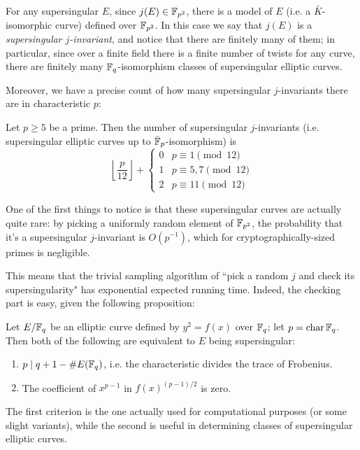 For any supersingular $E$, since $j(E)\in\mathbb{F}_{p^2}$, there is a model of $E$ (i.e. a $\bar K$-isomorphic curve) defined over $\mathbb{F}_{p^2}$. In this case we say that $j(E)$ is a \emph{supersingular $j$-invariant}, and notice that there are finitely many of them; in particular, since over a finite field there is a finite number of twists for any curve, there are finitely many $\mathbb{F}_q$-isomorphism classes of supersingular elliptic curves.

Moreover, we have a precise count of how many supersingular $j$-invariants there are in characteristic $p$:
\begin{theorem}
    Let $p\ge5$ be a prime. Then the number of supersingular $j$-invariants (i.e. supersingular elliptic curves up to $\bar{\mathbb{F}}_p$-isomorphism) is
    $$\left\lfloor \frac{p}{12} \right\rfloor + \begin{cases}
    0 & p\equiv1\pmod{12}\\
    1 & p\equiv5,7\pmod{12}\\
    2 & p\equiv11\pmod{12}
    \end{cases}$$
\end{theorem}

One of the first things to notice is that these supersingular curves are actually quite rare: by picking a uniformly random element of $\mathbb{F}_{p^2}$, the probability that it's a supersingular $j$-invariant is $O(p^{-1})$, which for cryptographically-sized primes is negligible.

This means that the trivial sampling algorithm of ``pick a random $j$ and check its supersingularity" has exponential expected running time. Indeed, the checking part is easy, given the following proposition:
\begin{proposition}
    Let $E/\mathbb{F}_q$ be an elliptic curve defined by $y^2=f(x)$ over $\mathbb{F}_q$; let $p=\operatorname{char}\mathbb{F}_q$. Then both of the following are equivalent to $E$ being supersingular:
    \begin{enumerate}
        \item $p\mid q+1-\# E(\mathbb{F}_q)$, i.e. the characteristic divides the trace of Frobenius.
        \item The coefficient of $x^{p-1}$ in $f(x)^{(p-1)/2}$ is zero.
    \end{enumerate}
\end{proposition}

The first criterion is the one actually used for computational purposes (or some slight variants), while the second is useful in determining classes of supersingular elliptic curves.

